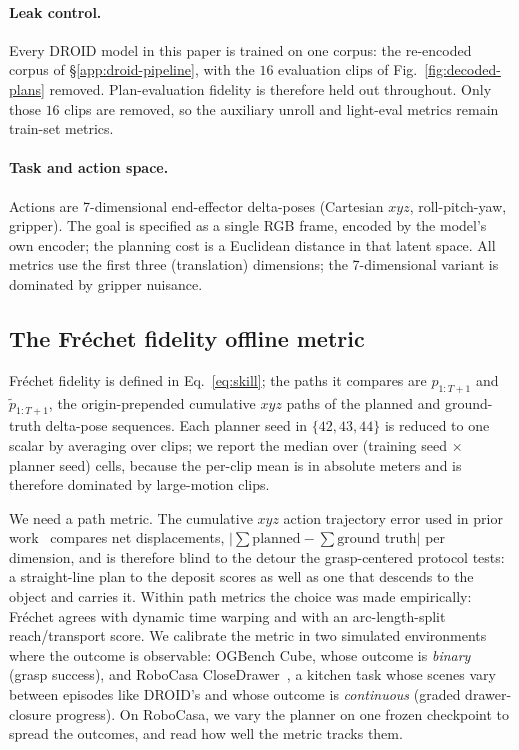 \paragraph{Leak control.} Every DROID model in this paper is trained on one corpus: the
re-encoded corpus of \S\ref{app:droid-pipeline}, with the $16$ evaluation clips of
Fig.~\ref{fig:decoded-plans} removed. Plan-evaluation fidelity is therefore held out
throughout. Only those $16$ clips are removed, so the auxiliary unroll and light-eval
metrics remain train-set metrics.

\paragraph{Task and action space.} Actions are 7-dimensional end-effector delta-poses
(Cartesian $xyz$, roll-pitch-yaw, gripper). The goal is specified as a single RGB
frame, encoded by the model's own encoder; the planning cost is a Euclidean distance in
that latent space. All metrics use the first three (translation) dimensions; the
7-dimensional variant is dominated by gripper nuisance.

\subsection{The Fr\'echet fidelity offline metric}
\label{app:frechet}

Fr\'echet fidelity is defined in Eq.~\eqref{eq:skill}; the paths it compares are
$p_{1:T+1}$ and $\tilde{p}_{1:T+1}$, the origin-prepended cumulative $xyz$ paths of the
planned and ground-truth delta-pose sequences. Each planner seed in $\{42,43,44\}$ is reduced to
one scalar by averaging over clips; we report the median over
(training seed $\times$ planner seed) cells, because the per-clip mean is in absolute
meters and is therefore dominated by large-motion clips.

We need a path metric. The cumulative $xyz$ action trajectory error used in prior
work~\citep{terver2026whatdrives,NWM} compares net
displacements, $|\sum \text{planned} - \sum \text{ground truth}|$ per dimension, and is
therefore blind to the detour the grasp-centered protocol tests: a
straight-line plan to the deposit scores as well as one that descends to the object and
carries it. Within path metrics the choice was made empirically: Fr\'echet agrees with dynamic time warping
and with an arc-length-split reach/transport score.
We calibrate the metric in two simulated environments where the outcome is observable:
OGBench Cube, whose outcome is \emph{binary} (grasp success), and RoboCasa
CloseDrawer~\citep{nasiriany2024robocasa}, a kitchen task whose scenes vary between episodes
like DROID's and whose outcome is \emph{continuous} (graded drawer-closure progress). On
RoboCasa, we vary the planner on one frozen checkpoint to spread the outcomes, and read how
well the metric tracks them.

